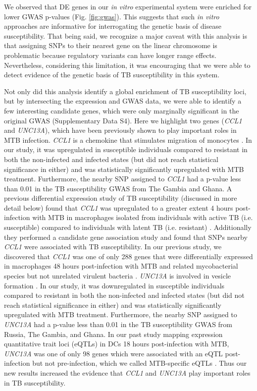\documentclass[fleqn,10pt]{wlscirep}
\begin{document}
We observed that DE genes in our \emph{in vitro} experimental system
were enriched for lower GWAS p-values (Fig. \ref{fig:gwas}). This
suggests that such \emph{in vitro} approaches are informative for
interrogating the genetic basis of disease susceptibility. That being
said, we recognize a major caveat with this analysis is that assigning
SNPs to their nearest gene on the linear chromosome is problematic
because regulatory variants can have longer range effects.
Nevertheless, considering this limitation, it was encouraging that we
were able to detect evidence of the genetic basis of TB susceptibility
in this system.

Not only did this analysis identify a global enrichment of TB
susceptibility loci, but by intersecting the expression and GWAS data,
we were able to identify a few interesting candidate genes, which were
only marginally significant in the original GWAS (Supplementary Data
S4). Here we highlight two genes (\emph{CCL1} and \emph{UNC13A}),
which have been previously shown to play important roles in MTB
infection. \emph{CCL1} is a chemokine that stimulates migration of
monocytes \cite{Miller1992}. In our study, it was upregulated in
susceptible individuals compared to resistant in both the non-infected
and infected states (but did not reach statistical significance in
either) and was statistically significantly upregulated with MTB
treatment. Furthermore, the nearby SNP assigned to \emph{CCL1} had a
p-value less than 0.01 in the TB susceptibility GWAS from The Gambia
and Ghana. A previous differential expression study of TB
susceptibility (discussed in more detail below) found that \emph{CCL1}
was upregulated to a greater extent 4 hours post-infection with MTB in
macrophages isolated from individuals with active TB (i.e.
susceptible) compared to individuals with latent TB (i.e. resistant)
\cite{Thuong2008}. Additionally they performed a candidate gene
association study and found that SNPs nearby \emph{CCL1} were
associated with TB susceptibility. In our previous study, we
discovered that \emph{CCL1} was one of only 288 genes that were
differentially expressed in macrophages 48 hours post-infection with
MTB and related mycobacterial species but not unrelated virulent
bacteria \cite{Blischak2015}. \emph{UNC13A} is involved in vesicle
formation \cite{Sudhof2004}. In our study, it was downregulated in
susceptible individuals compared to resistant in both the non-infected
and infected states (but did not reach statistical significance in
either) and was statistically significantly upregulated with MTB
treatment. Furthermore, the nearby SNP assigned to \emph{UNC13A} had a
p-value less than 0.01 in the TB susceptibility GWAS from Russia, The
Gambia, and Ghana. In our past study mapping expression quantitative
trait loci (eQTLs) in DCs 18 hours post-infection with MTB,
\emph{UNC13A} was one of only 98 genes which were associated with an
eQTL post-infection but not pre-infection, which we called
MTB-specific eQTLs \cite{Barreiro2012}. Thus our new results increased
the evidence that \emph{CCL1} and \emph{UNC13A} play important roles
in TB susceptibility.
\end{document}
